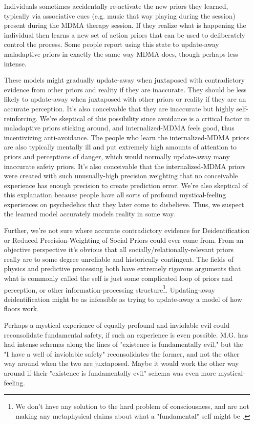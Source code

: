 \documentclass[12pt,letterpaper]{book}
\begin{document}
Individuals sometimes accidentally re-activate the new priors they learned, typically via associative cues (e.g. music that way playing during the session) present during the MDMA therapy session. If they realize what is happening the individual then learns a new set of action priors that can be used to deliberately control the process. Some people report using this state to update-away maladaptive priors in exactly the same way MDMA does, though perhaps less intense.

These models might gradually update-away when juxtaposed with contradictory evidence from other priors and reality if they are inaccurate. They should be less likely to update-away when juxtaposed with other priors or reality if they are an accurate perception. It's also conceivable that they are inaccurate but highly self-reinforcing. We're skeptical of this possibility since avoidance is a critical factor in maladaptive priors sticking around, and internalized-MDMA feels good, thus incentivizing anti-avoidance. The people who learn the internalized-MDMA priors are also typically mentally ill and put extremely high amounts of attention to priors and perceptions of danger, which would normally update-away many inaccurate safety priors. It's also conceivable that the internalized-MDMA priors were created with such unusually-high precision weighting that no conceivable experience has enough precision to create prediction error. We're also skeptical of this explanation because people have all sorts of profound mystical-feeling experiences on psychedelics that they later come to disbelieve. Thus, we suspect the learned model accurately models reality in some way.

Further, we're not sure where accurate contradictory evidence for Deidentification or Reduced Precision-Weighting of Social Priors could ever come from. From an objective perspective it's obvious that all socially/relationally-relevant priors really are to some degree unreliable and historically contingent. The fields of physics and predictive processing both have extremely rigorous arguments that what is commonly called the self is just some complicated loop of priors and perception, or other information-processing structure\footnote{We don't have any solution to the hard problem of consciousness, and are not making any metaphysical claims about what a "fundamental" self might be \cite{hardProblem}.}. Updating-away deidentification might be as infeasible as trying to update-away a model of how floors work.

Perhaps a mystical experience of equally profound and inviolable evil could reconsolidate fundamental safety, if such an experience is even possible. M.G. has had intense schemas along the lines of "existence is fundamentally evil," but the "I have a well of inviolable safety" reconsolidates the former, and not the other way around when the two are juxtaposed. Maybe it would work the other way around if their "existence is fundamentally evil" schema was even more mystical-feeling.
\end{document}
